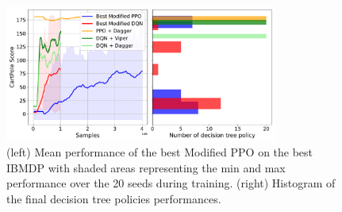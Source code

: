 \begin{figure}
    \centering
    \includegraphics[width=0.8\textwidth]{images/images_part1/ppo_tree_study.pdf}
    \caption{(left) Mean performance of the best Modified PPO on the best IBMDP with shaded areas representing the min and max performance over the 20 seeds during training. (right) Histogram of the final decision tree policies performances.}
\end{figure}


